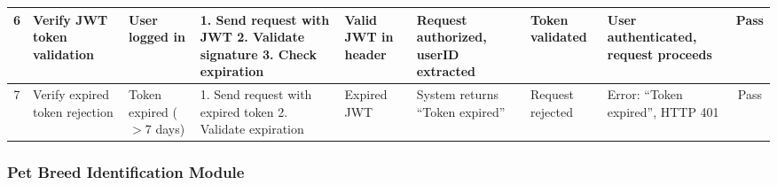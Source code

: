 \begin{table}[H]
{\begin{tabular}{|c|p{3cm}|p{2.5cm}|p{3.5cm}|p{3cm}|p{3cm}|p{2.5cm}|p{2.5cm}|c|}
6 & Verify JWT token validation & User logged in & 1. Send request with JWT 2. Validate signature 3. Check expiration & Valid JWT in header & Request authorized, userID extracted & Token validated & User authenticated, request proceeds & Pass \\ \hline
7 & Verify expired token rejection & Token expired ($>$7 days) & 1. Send request with expired token 2. Validate expiration & Expired JWT & System returns ``Token expired'' & Request rejected & Error: ``Token expired'', HTTP 401 & Pass \\ \hline
\end{tabular}%
}
\label{tab:ut_auth}
\end{table}

\subsubsection{Pet Breed Identification Module}

